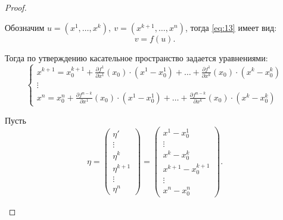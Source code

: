 \begin{proof}
\begin{enumerate}
              Обозначим $u = (x^1,\ldots,x^k), \ v = (x^{k+1},\ldots,x^n)$, тогда \ref{eq:13} имеет вид:
              \[
                  v = f(u).
              \]

              Тогда по утверждению касательное пространство задается уравнениями:
              \begin{equation}\label{eq:14}
                  \left\{\begin{array}{l}
                      x^{k+1} = x_0^{k + 1} + \frac{\partial f^1}{\partial x^1}(x_0)\cdot(x^1-x_0^1) + \ldots + \frac{\partial f^1}{\partial x^k}(x_0)\cdot(x^k - x_0^k) \\
                      \vdots                                                                                                                                     \\
                      x^n = x_0^n + \frac{\partial f^{n-k}}{\partial x^1}(x_0)\cdot(x^1 - x_0^1) + \ldots + \frac{\partial f^{n-k}}{\partial x^k}(x_0)\cdot(x^k - x_0^k)
                  \end{array}\right.
              \end{equation}

              Пусть
              \[
                  \eta = \left(\begin{matrix}
                          \eta'      \\
                          \vdots     \\
                          \eta^k     \\
                          \eta^{k+1} \\
                          \vdots     \\
                          \eta^n
                      \end{matrix}\right) = \left(\begin{matrix}
                          x^1 - x_0^1         \\
                          \vdots              \\
                          x^k - x_0^k         \\
                          x^{k+1} - x^{k+1}_0 \\
                          \vdots              \\
                          x^n - x_0^n
                      \end{matrix}\right).
              \]


\end{enumerate}
\end{proof}
